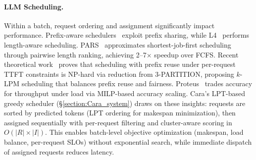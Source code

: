 \documentclass[letterpaper, anonymous, twocolumn, 10pt]{article}
\begin{document}
\paragraph{LLM Scheduling.}
Within a batch, request ordering and assignment significantly impact performance.
Prefix-aware schedulers~\cite{arango2025prefix} exploit prefix sharing, while L4~\cite{l4lengthaware} performs length-aware scheduling.
PARS~\cite{pars2025} approximates shortest-job-first scheduling through pairwise length ranking, achieving 2--7$\times$ speedup over FCFS.
Recent theoretical work~\cite{klpm2025} proves that scheduling with prefix reuse under per-request TTFT constraints is NP-hard via reduction from 3-PARTITION, proposing $k$-LPM scheduling that balances prefix reuse and fairness.
Proteus~\cite{proteus2024} trades accuracy for throughput under load via MILP-based accuracy scaling.
Cara's LPT-based greedy scheduler (\S\ref{section:Cara_system}) draws on these insights: requests are sorted by predicted tokens (LPT ordering for makespan minimization), then assigned sequentially with per-request filtering and cluster-aware scoring in $O(|R| \times |I|)$.
This enables batch-level objective optimization (makespan, load balance, per-request SLOs) without exponential search, while immediate dispatch of assigned requests reduces latency.
\end{document}
